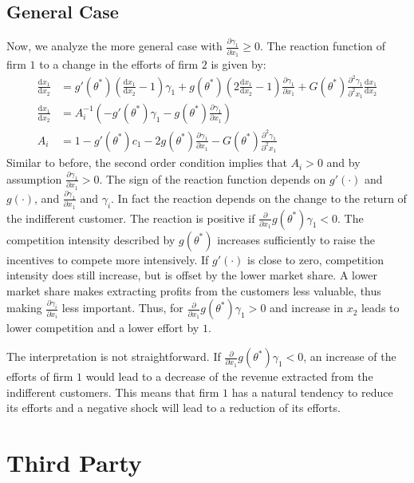 \documentclass[a4paper, 11pt]{article}
\renewcommand{\d}{\text{d}}
\begin{document}
\subsection{General Case}
Now, we analyze the more general case with $\frac{\partial \gamma_1}{\partial x_1}\geq 0$. The reaction function of firm $1$ to a change in the efforts of firm $2$ is given by:
\begin{align}
\frac{\d x_1}{\d x_2} &= g'(\theta^*)\left(\tfrac{\d x_1}{\d x_2}-1\right)\gamma_1 + g(\theta^*)\left(2\tfrac{\d x_1}{\d x_2}-1\right)\tfrac{\partial \gamma_1}{\partial x_1} + G(\theta^*)\tfrac{\partial^2 \gamma_1}{\partial^2 x_1}\tfrac{\d x_1}{\d x_2}\nonumber\\
\frac{\d x_1}{\d x_2} &= A_i^{-1} \left(-g'(\theta^*)\gamma_1- g(\theta^*)\frac{\partial \gamma_1}{\partial x_1}\right)\\
A_i &= 1 - g'(\theta^*)c_1-2g(\theta^*)\frac{\partial \gamma_1}{\partial x_1}-G(\theta^*)\frac{\partial^2 \gamma_1}{\partial^2 x_1}
\end{align}
Similar to before, the second order condition implies that $A_i>0$ and by assumption $\frac{\partial \gamma_1}{\partial x_1}>0$. The sign of the reaction function depends on $g'(\cdot)$ and $g(\cdot)$, and $\frac{\partial \gamma_1}{\partial x_1}$ and $\gamma_i$. In fact the reaction depends on the change to the return of the indifferent customer. The reaction is positive if $\frac{\partial}{\partial x_1} g(\theta^*)\gamma_1<0$. The competition intensity described by $g(\theta^*)$ increases sufficiently to raise the incentives to compete more intensively. If $g'(\cdot)$ is close to zero, competition intensity does still increase, but is offset by the lower market share. A lower market share makes extracting profits from the customers less valuable, thus making $\frac{\partial \gamma_i}{\partial x_i}$ less important. Thus, for $\frac{\partial}{\partial x_1} g(\theta^*)\gamma_1>0$ and increase in $x_2$ leads to lower competition and a lower effort by $1$.

The interpretation is not straightforward. If $\frac{\partial}{\partial x_1} g(\theta^*)\gamma_1<0$, an increase of the efforts of firm $1$ would lead to a decrease of the revenue extracted from the indifferent customers. This means that firm $1$ has a natural tendency to reduce its efforts and a negative shock will lead to a reduction of its efforts. 

\section{Third Party}
\end{document}
